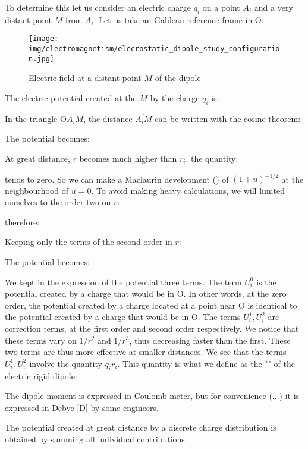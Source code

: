 	To determine this let us consider an electric charge $q_i$ on a point $A_i$ and a very distant point $M$ from $A_i$. Let us take an Galilean reference frame in O:
	\begin{figure}[H]
		\centering
		\texttt{[image: img/electromagnetism/elecrostatic\_dipole\_study\_configuration.jpg]}
		\caption{Electric field at a distant point $M$ of the dipole}
	\end{figure}
	The electric potential created at the $M$ by the charge $q_i$ is:
	
	In the triangle $\text{O}A_i M$, the distance $\overline{A_i M}$ can be written with the cosine theorem:
	
	The potential becomes:
	
	At great distance, $r$ becomes much higher than $r_i$, the quantity:
	
	tends to zero. So we can make a Maclaurin development () of $(1+u)^{-1/2}$ at the neighbourhood of $u=0$. To avoid making heavy calculations, we will limited ourselves to the order two on $r$:
	
	therefore:
	
	Keeping only the terms of the second order in $r$:
	
	The potential becomes:
	
	We kept in the expression of the potential three terms. The term $U_i^0$ is the potential created by a charge that would be in O. In other words, at the zero order, the potential created by a charge located at a point near O is identical to the potential created by a charge that would be in O. The terms $U_i^1,U_i^2$ are correction terms, at the first order and second order respectively. We notice that these terms vary on $1/r^2$ and $1/r^3$, thus decreasing faster than the first. These two terms are thus more effective at smaller distances.
	We see that the terms $U_i^1,U_i^2$ involve the quantity $q_ir_i$. This quantity is what we define as the "" of the electric rigid dipole:
	
	\begin{tcolorbox}[title=Remark,colframe=black,arc=10pt]
	The dipole moment is expressed in Coulomb meter, but for convenience (...) it is expressed in Debye [D] by some engineers.
	\end{tcolorbox}
	The potential created at great distance by a discrete charge distribution is obtained by summing all individual contributions:
	
